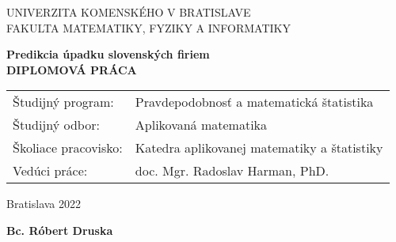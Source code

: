\newpage
\thispagestyle{empty}
\begin{center}
{\large UNIVERZITA KOMENSKÉHO V BRATISLAVE \\
FAKULTA MATEMATIKY, FYZIKY A INFORMATIKY}
\end{center}


\vspace{5cm}
\begin{center}
{\large \bf Predikcia úpadku slovenských firiem \\
\vspace{3cm}
DIPLOMOVÁ PRÁCA}
\end{center}

\vfill
\begin{flushleft}
\begin{tabular}{ll}
Študijný program: & Pravdepodobnosť a matematická štatistika \\
Študijný odbor: & Aplikovaná matematika \\
Školiace pracovisko: & Katedra aplikovanej matematiky a štatistiky \\
Vedúci práce: & doc. Mgr. Radoslav Harman, PhD. \\
\end{tabular}
\end{flushleft}

\vfill
%
\begin{multicols}{2}
\begin{flushleft} Bratislava 2022 \end{flushleft}
\begin{flushright} {\bf Bc. Róbert Druska} \end{flushright}
\end{multicols}

